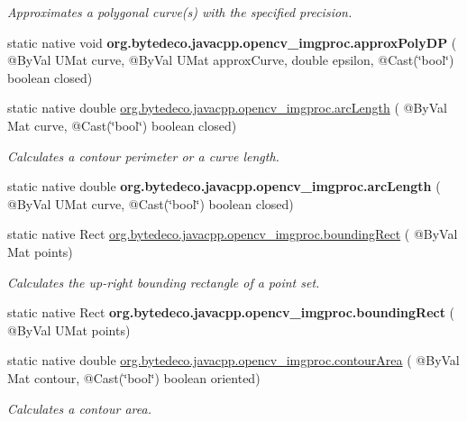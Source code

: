 \begin{DoxyCompactItemize}
\begin{DoxyCompactList}\small\item\em Approximates a polygonal curve(s) with the specified precision. \end{DoxyCompactList}\item 
\mbox{\label{group__imgproc__shape_ga53cc7853fbb42e0adb50e055b06aed60}} 
static native void {\bfseries org.\+bytedeco.\+javacpp.\+opencv\+\_\+imgproc.\+approx\+Poly\+DP} ( @By\+Val U\+Mat curve, @By\+Val U\+Mat approx\+Curve, double epsilon, @Cast(\char`\"{}bool\char`\"{}) boolean closed)
\item 
static native double \hyperlink{group__imgproc__shape_gad6c8dc05432d5351a7480042bbbbe328}{org.\+bytedeco.\+javacpp.\+opencv\+\_\+imgproc.\+arc\+Length} ( @By\+Val Mat curve, @Cast(\char`\"{}bool\char`\"{}) boolean closed)
\begin{DoxyCompactList}\small\item\em Calculates a contour perimeter or a curve length. \end{DoxyCompactList}\item 
\mbox{\label{group__imgproc__shape_ga1cdab039b5a1b5d3c72eed7fcb024319}} 
static native double {\bfseries org.\+bytedeco.\+javacpp.\+opencv\+\_\+imgproc.\+arc\+Length} ( @By\+Val U\+Mat curve, @Cast(\char`\"{}bool\char`\"{}) boolean closed)
\item 
static native Rect \hyperlink{group__imgproc__shape_ga8e749f0c2a90af2956b90b60689d6602}{org.\+bytedeco.\+javacpp.\+opencv\+\_\+imgproc.\+bounding\+Rect} ( @By\+Val Mat points)
\begin{DoxyCompactList}\small\item\em Calculates the up-\/right bounding rectangle of a point set. \end{DoxyCompactList}\item 
\mbox{\label{group__imgproc__shape_gacafd59dde2f78776d5dc39328cd5da3a}} 
static native Rect {\bfseries org.\+bytedeco.\+javacpp.\+opencv\+\_\+imgproc.\+bounding\+Rect} ( @By\+Val U\+Mat points)
\item 
static native double \hyperlink{group__imgproc__shape_ga5de110872b0023d4176fcc7c3f2c6115}{org.\+bytedeco.\+javacpp.\+opencv\+\_\+imgproc.\+contour\+Area} ( @By\+Val Mat contour, @Cast(\char`\"{}bool\char`\"{}) boolean oriented)
\begin{DoxyCompactList}\small\item\em Calculates a contour area. \end{DoxyCompactList}\item 

\end{DoxyCompactItemize}
